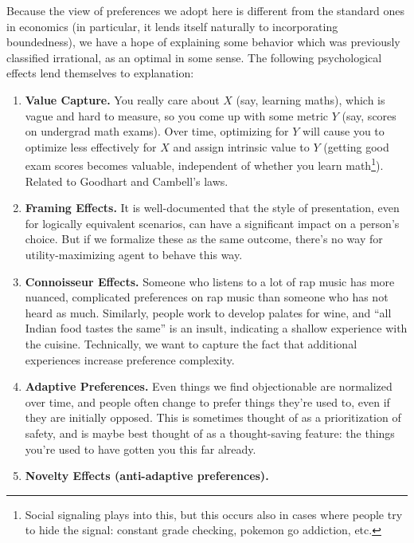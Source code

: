 \documentclass{article}
\theoremstyle{plain}
\theoremstyle{definition}
\theoremstyle{remark}
\begin{document}
	Because the view of preferences we adopt here is different from the standard ones in economics (in particular, it lends itself naturally to incorporating boundedness), we have a hope of explaining some behavior which was previously classified irrational, as an optimal in some sense. The following psychological effects lend themselves to explanation:
	\begin{enumerate}[noitemsep]
		\item \textbf{Value Capture.} You really care about $X$ (say, learning maths), which is vague and hard to measure, so you come up with some metric $Y$ (say, scores on undergrad math exams). Over time, optimizing for $Y$ will cause you to optimize less effectively for $X$ and assign intrinsic value to $Y$ (getting good exam scores becomes valuable, independent of whether you learn math\footnote{Social signaling plays into this, but this occurs also in cases where people try to hide the signal: constant grade checking, pokemon go addiction, etc.}). Related to Goodhart and Cambell's laws.
		\item \textbf{Framing Effects.} It is well-documented that the style of presentation, even for logically equivalent scenarios, can have a significant impact on a person's choice. But if we formalize these as the same outcome, there's no way for utility-maximizing agent to behave this way.
		\item \textbf{Connoisseur Effects.} Someone who listens to a lot of rap music has more nuanced, complicated preferences on rap music than someone who has not heard as much. Similarly, people work to develop palates for wine, and ``all Indian food tastes the same'' is an insult, indicating a shallow experience with the cuisine. Technically, we want to capture the fact that additional experiences increase preference complexity.
		
		\item \textbf{Adaptive Preferences.} Even things we find objectionable are normalized over time, and people often change to prefer things they're used to, even if they are initially opposed. This is sometimes thought of as a prioritization of safety, and is maybe best thought of as a thought-saving feature: the things you're used to have gotten you this far already. 
		 
		\item \textbf{Novelty Effects (anti-adaptive preferences).} 

	\end{enumerate}
\end{document}
